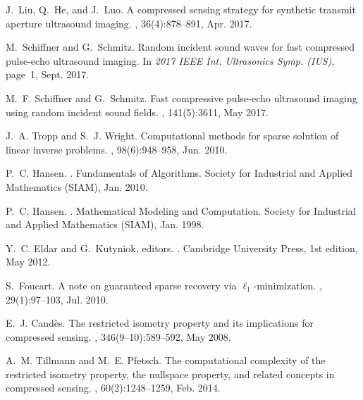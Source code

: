 \documentclass[10pt,twocolumn,romanappendices,final]{IEEEtran}
\begin{document}
\begin{thebibliography}{100}
J.~Liu, Q.~He, and J.~Luo.
\newblock A compressed sensing strategy for synthetic transmit aperture
  ultrasound imaging.
, 36(4):878--891, Apr. 2017.

M.~Schiffner and G.~Schmitz.
\newblock Random incident sound waves for fast compressed pulse-echo ultrasound
  imaging.
\newblock In {\em 2017 IEEE Int. Ultrasonics Symp. (IUS)}, page~1, Sept. 2017.

M.~F. Schiffner and G.~Schmitz.
\newblock Fast compressive pulse-echo ultrasound imaging using random incident
  sound fields.
, 141(5):3611, May 2017.

J.~A. Tropp and S.~J. Wright.
\newblock Computational methods for sparse solution of linear inverse problems.
, 98(6):948--958, Jun. 2010.

P.~C. Hansen.
.
\newblock Fundamentals of Algorithms. Society for Industrial and Applied
  Mathematics (SIAM), Jan. 2010.

P.~C. Hansen.
.
\newblock Mathematical Modeling and Computation. Society for Industrial and
  Applied Mathematics (SIAM), Jan. 1998.

Y.~C. Eldar and G.~Kutyniok, editors.
.
\newblock Cambridge University Press, 1st edition, May 2012.

S.~Foucart.
\newblock A note on guaranteed sparse recovery via {$\ell_{1}$}-minimization.
, 29(1):97--103, Jul. 2010.

E.~J. Candès.
\newblock The restricted isometry property and its implications for compressed
  sensing.
, 346(9--10):589--592, May 2008.

A.~M. Tillmann and M.~E. Pfetsch.
\newblock The computational complexity of the restricted isometry property, the
  nullspace property, and related concepts in compressed sensing.
, 60(2):1248--1259, Feb. 2014.


\end{thebibliography}
\end{document}

